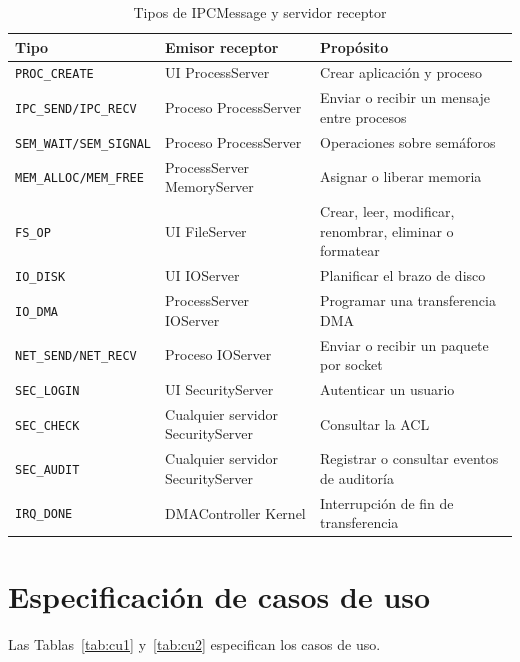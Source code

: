\documentclass[conference]{IEEEtran}
\begin{document}
\begin{table}[!t]
\caption{Tipos de IPCMessage y servidor receptor}
\label{tab:msg}
\scriptsize\renewcommand{\arraystretch}{1.1}\setlength{\tabcolsep}{2pt}
\begin{tabular}{|>{\raggedright\arraybackslash}p{2.5cm}|>{\raggedright\arraybackslash}p{2.9cm}|>{\raggedright\arraybackslash}p{2.9cm}|}
\hline \textbf{Tipo} & \textbf{Emisor \textrightarrow{} receptor} & \textbf{Propósito}\\ \hline
\texttt{PROC\_CREATE} & UI \textrightarrow{} ProcessServer & Crear aplicación y proceso\\ \hline
\texttt{IPC\_SEND/\allowbreak IPC\_RECV} & Proceso \textrightarrow{} ProcessServer & Enviar o recibir un mensaje entre procesos\\ \hline
\texttt{SEM\_WAIT/\allowbreak SEM\_SIGNAL} & Proceso \textrightarrow{} ProcessServer & Operaciones sobre semáforos\\ \hline
\texttt{MEM\_ALLOC/\allowbreak MEM\_FREE} & ProcessServer \textrightarrow{} MemoryServer & Asignar o liberar memoria\\ \hline
\texttt{FS\_OP} & UI \textrightarrow{} FileServer & Crear, leer, modificar, renombrar, eliminar o formatear\\ \hline
\texttt{IO\_DISK} & UI \textrightarrow{} IOServer & Planificar el brazo de disco\\ \hline
\texttt{IO\_DMA} & ProcessServer \textrightarrow{} IOServer & Programar una transferencia DMA\\ \hline
\texttt{NET\_SEND/\allowbreak NET\_RECV} & Proceso \textrightarrow{} IOServer & Enviar o recibir un paquete por socket\\ \hline
\texttt{SEC\_LOGIN} & UI \textrightarrow{} SecurityServer & Autenticar un usuario\\ \hline
\texttt{SEC\_CHECK} & Cualquier servidor \textrightarrow{} SecurityServer & Consultar la ACL\\ \hline
\texttt{SEC\_AUDIT} & Cualquier servidor \textrightarrow{} SecurityServer & Registrar o consultar eventos de auditoría\\ \hline
\texttt{IRQ\_DONE} & DMAController \textrightarrow{} Kernel & Interrupción de fin de transferencia\\ \hline
\end{tabular}
\end{table}

\clearpage
\section{Especificación de casos de uso}\label{ax:cu}
Las Tablas~\ref{tab:cu1} y~\ref{tab:cu2} especifican los casos de uso.
\end{document}
